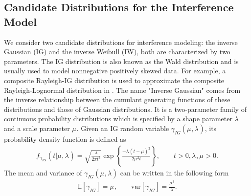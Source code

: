 \documentclass[12pt, draftclsnofoot, onecolumn]{IEEEtran}
\theoremstyle{plain}
\begin{document}
\subsection{Candidate Distributions for the Interference Model}%
We consider two candidate distributions for interference modeling: the {inverse Gaussian} (IG) and the {inverse Weibull} (IW), both are characterized by two parameters. 
The IG distribution is also known as the Wald distribution and is usually used to model nonnegative positively skewed data. {For example, a composite Rayleigh-IG distribution is used to approximate the composite Rayleigh-Lognormal distribution in \cite{KL_IG_agrawal2007efficacy}}.
The name "Inverse Gaussian" comes from the inverse relationship
between the cumulant generating functions of these distributions and those of Gaussian distributions. It is a two-parameter family of continuous probability distributions which is specified by a shape parameter ${{\lambda_{}}}$ and a scale parameter ${{\mu_{}}}$. Given an IG random variable $\gamma_{IG}({{\mu_{}}},{{\lambda_{}}})$, its probability density function is defined as {\cite{IG1tweedie1957statistical,IG2tweedie1957statistical,IG1}}
\begin{eqnarray}
f_{\gamma_{IG}}(t|{{\mu_{}}},{{\lambda_{}}})=\sqrt{\frac{{{\lambda_{}}}}{2\pi t^3}} \exp \left\{\frac{-{{\lambda_{}}} (t-{{\mu_{}}})^2}{2 {{\mu_{}}}^2 t} \right\}, \quad \quad t > 0, {{\lambda_{}}}, {{\mu_{}}} >0.\label{f_IG}
\end{eqnarray}
The mean and variance of $\gamma_{IG}({{\mu_{}}},{{\lambda_{}}})$ can be written in the following form \cite{IG1} \vspace{-.1in}
\begin{eqnarray}\label{Param1}
\mathbb{E}[\gamma_{IG}]={{\mu_{}}}, \quad \quad
\text{var}[\gamma_{IG}]=\frac{{{\mu_{}}}^3}{{{\lambda_{}}}}.\label{Param2}
\end{eqnarray}
\end{document}
